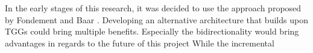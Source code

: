 In the early stages of this research, it was decided to use the approach proposed by Fondement and Baar \cite{fondement_making_2005}. Developing an alternative architecture that builds upon TGGs could bring multiple benefits. Especially the bidirectionality would bring advantages in regards to the future of this project While the incremental 




